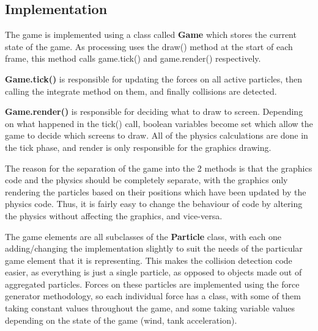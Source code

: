 \documentclass[12pt]{article}
\begin{document}
\subsection{Implementation}
The game is implemented using a class called \textbf{Game} which stores the current state of the game. As processing uses the draw() method at the start of each frame, this method calls game.tick() and game.render() respectively.
\par
\textbf{Game.tick()} is responsible for updating the forces on all active particles, then calling the integrate method on them, and finally collisions are detected. 
\par 
\textbf{Game.render()} is responsible for deciding what to draw to screen. Depending on what happened in the tick() call, boolean variables become set which allow the game to decide which screens to draw. All of the physics calculations are done in the tick phase, and render is only responsible for the graphics drawing.
\par 
The reason for the separation of the game into the 2 methods is that the graphics code and the physics should be completely separate, with the graphics only rendering the particles based on their positions which have been updated by the physics code. Thus, it is fairly easy to change the behaviour of code by altering the physics without affecting the graphics, and vice-versa.
\par 
The game elements are all subclasses of the \textbf{Particle} class, with each one adding/changing the implementation slightly to suit the needs of the particular game element that it is representing. This makes the collision detection code easier, as everything is just a single particle, as opposed to objects made out of aggregated particles. Forces on these particles are implemented using the force generator methodology, so each individual force has a class, with some of them taking constant values throughout the game, and some taking variable values depending on the state of the game (wind, tank acceleration).
\end{document}
